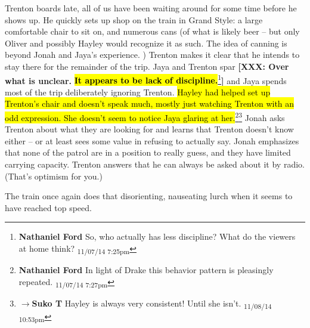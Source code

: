 Trenton boards late, all of us have been waiting around for some time before he shows up.  He quickly sets up shop on the train in Grand Style: a large comfortable chair to sit on, and numerous cans (of what is likely beer – but only Oliver and possibly Hayley would recognize it as such.  The idea of canning is beyond Jonah and Jaya's experience. )  Trenton makes it clear that he intends to stay there for the remainder of the trip.  Jaya and Trenton spar \textbf{{[}XXX: Over what is unclear.  }\textbf{\hl{It appears to be lack of discipline.}}\footnote{\textbf{Nathaniel Ford }So, who actually has less discipline? What do the viewers at home think? \textsubscript{11/07/14 7:25pm}}\textbf{{]}} and Jaya spends most of the trip deliberately ignoring Trenton.  \hl{Hayley had helped set up Trenton's chair and doesn't speak much, mostly just watching Trenton with an odd expression.  She doesn't seem to notice Jaya glaring at her.}\footnote{\textbf{Nathaniel Ford }In light of Drake this behavior pattern is pleasingly repeated. \textsubscript{11/07/14 7:27pm}}\footnote{$\rightarrow$\textbf{Suko T }Hayley is always very consistent!  Until she isn't. \textsubscript{11/08/14 10:53pm}}  Jonah asks Trenton about what they are looking for and learns that Trenton doesn't know either – or at least sees some value in refusing to actually say.  Jonah emphasizes that none of the patrol are in a position to really guess, and they have limited carrying capacity.  Trenton answers that he can always be asked about it by radio.  (That's optimism for you.)



The train once again does that disorienting, nauseating lurch when it seems to have reached top speed.







